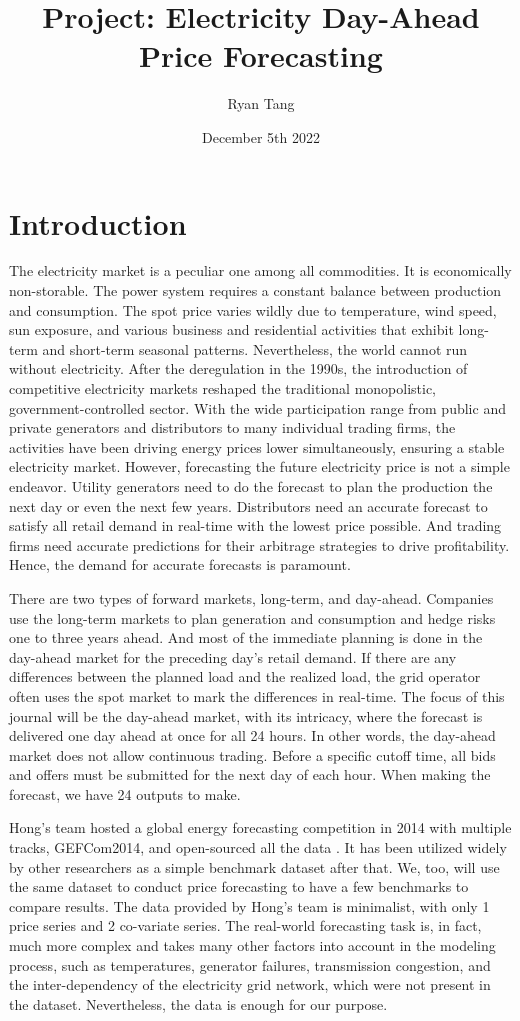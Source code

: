 \documentclass[11pt, letterpaper, journal]{IEEEtran}
\title{Project: Electricity Day-Ahead Price Forecasting}
\author[1]{Ryan Tang}
\affil[1]{Duke University, Statistical Science}
\date{December 5th 2022}
\begin{document}
\maketitle

\section{Introduction}
The electricity market is a peculiar one among all commodities. It is economically non-storable. The power system requires a constant balance between production and consumption. The spot price varies wildly due to temperature, wind speed, sun exposure, and various business and residential activities that exhibit long-term and short-term seasonal patterns. Nevertheless, the world cannot run without electricity. After the deregulation in the 1990s, the introduction of competitive electricity markets reshaped the traditional monopolistic, government-controlled sector. With the wide participation range from public and private generators and distributors to many individual trading firms, the activities have been driving energy prices lower simultaneously, ensuring a stable electricity market. However, forecasting the future electricity price is not a simple endeavor. Utility generators need to do the forecast to plan the production the next day or even the next few years. Distributors need an accurate forecast to satisfy all retail demand in real-time with the lowest price possible. And trading firms need accurate predictions for their arbitrage strategies to drive profitability. Hence, the demand for accurate forecasts is paramount. 

There are two types of forward markets, long-term, and day-ahead. Companies use the long-term markets to plan generation and consumption and hedge risks one to three years ahead. And most of the immediate planning is done in the day-ahead market for the preceding day's retail demand. If there are any differences between the planned load and the realized load, the grid operator often uses the spot market to mark the differences in real-time. The focus of this journal will be the day-ahead market, with its intricacy, where the forecast is delivered one day ahead at once for all 24 hours. In other words, the day-ahead market does not allow continuous trading. Before a specific cutoff time, all bids and offers must be submitted for the next day of each hour. When making the forecast, we have 24 outputs to make.

Hong's team hosted a global energy forecasting competition in 2014 with multiple tracks, GEFCom2014, and open-sourced all the data \cite{HONG2016896}. It has been utilized widely by other researchers as a simple benchmark dataset after that. We, too, will use the same dataset to conduct price forecasting to have a few benchmarks to compare results. The data provided by Hong's team is minimalist, with only 1 price series and 2 co-variate series. The real-world forecasting task is, in fact, much more complex and takes many other factors into account in the modeling process, such as temperatures, generator failures, transmission congestion, and the inter-dependency of the electricity grid network, which were not present in the dataset. Nevertheless, the data is enough for our purpose.
\end{document}
